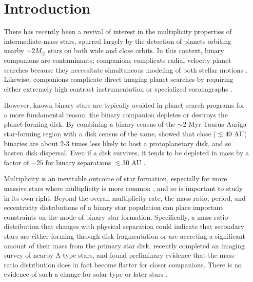 \documentclass{emulateapj}
\begin{document}
\maketitle

\section{Introduction}


\label{sec:intro}
There has recently been a revival of interest in the multiplicity properties of intermediate-mass stars,  spurred largely by the detection of planets orbiting nearby $\sim 2 M_{\odot}$ stars on both wide \citep[e.g.][]{Lagrange2010, Marois2008} and close \citep{Johnson2011} orbits. In this context, binary companions are contaminants; companions complicate radial velocity planet searches because they necessitate simultaneous modeling of both stellar motions \citep[e.g.][]{Bergmann2015}. Likewise, companions complicate direct imaging planet searches by requiring either extremely high contrast instrumentation \citep{Thalmann2014} or specialized coronagraphs \citep{Crepp2010}. 

However, known binary stars are typically avoided in planet search programs for a more fundamental reason: the binary companion depletes or destroys the planet-forming disk. By combining a binary census of the $\sim 2$ Myr Taurus-Auriga star-forming region with a disk census of the same, \cite{Kraus2012} showed that close ($\lesssim 40$ AU) binaries are about 2-3 times less likely to host a protoplanetary disk, and so hasten disk dispersal. Even if a disk survives, it tends to be depleted in mass by a factor of $\sim 25$ for binary separations $\lesssim 30$ AU \citep{Harris2012}.

Multiplicity is an inevitable outcome of star formation, especially for more massive stars where multiplicity is more common \citep{Zinnecker2007}, and so is important to study in its own right. Beyond the overall multiplicity rate, the mass ratio, period, and eccentricity distributions of a binary star population can place important constraints on the mode of binary star formation. Specifically, a mass-ratio distribution that changes with physical separation could indicate that secondary stars are either forming through disk fragmentation \citep[e.g.][]{Kratter2006, Stamatellos2011}  or are accreting a significant amount of their mass from the primary star disk. \cite{DeRosa2014} recently completed an imaging survey of nearby A-type stars, and found preliminary evidence that the mass-ratio distribution does in fact become flatter for closer companions. There is no evidence of such a change for solar-type or later stars \citep{Meyer2013}.
\end{document}
